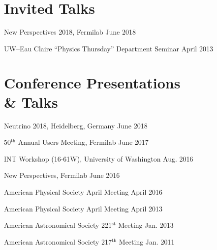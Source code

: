 \documentclass[11pt]{cv}
\begin{document}
\begin{cv}
\section{Invited Talks}
\begin{etaremune}
  \item New Perspectives 2018, Fermilab \hfill June 2018
  \item UW--Eau Claire ``Physics Thursday'' Department Seminar \hfill April 2013
\end{etaremune}


\section{Conference Presentations \\ \& Talks}
\begin{etaremune}
  \item Neutrino 2018, Heidelberg, Germany \hfill June 2018
  \item 50$^{\text{th}}$ Annual Users Meeting, Fermilab \hfill June 2017
  \item INT Workshop (16-61W), University of Washington \hfill Aug. 2016
  \item New Perspectives, Fermilab \hfill June 2016
  \item American Physical Society April Meeting \hfill April 2016
  \item American Physical Society April Meeting \hfill April 2013
  \item American Astronomical Society 221${^\text{st}}$ Meeting \hfill Jan. 2013
  \item American Astronomical Society 217${^\text{th}}$ Meeting \hfill Jan. 2011
\end{etaremune}





\end{cv}
\end{document}
